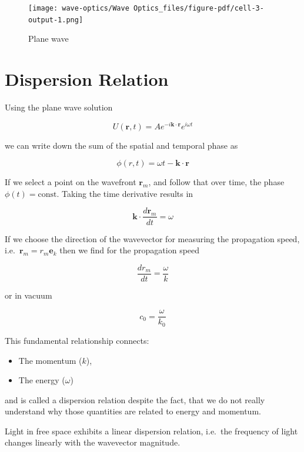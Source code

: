 \documentclass[
  a4paper,
]{book}
\providecommand{\tightlist}{%
  \setlength{\itemsep}{0pt}\setlength{\parskip}{0pt}}
\begin{document}
\begin{figure}[H]

{\centering \texttt{[image: wave-optics/Wave Optics\_files/figure-pdf/cell-3-output-1.png]}

}

\caption{Plane wave}

\end{figure}%

\section{Dispersion Relation}\label{dispersion-relation}

Using the plane wave solution

\begin{equation}
U(\mathbf{r},t)=Ae^{-i\mathbf{k}\cdot \mathbf{r}}e^{i\omega t}
\end{equation}

we can write down the sum of the spatial and temporal phase as

\[
\phi(r,t)=\omega t-\mathbf{k}\cdot \mathbf{r}
\]

If we select a point on the wavefront \(\mathbf{r}_{m}\), and follow
that over time, the phase \(\phi(t)=\text{const}\). Taking the time
derivative results in

\[
\mathbf{k}\cdot \frac{d\mathbf{r}_{m}}{dt}=\omega
\]

If we choose the direction of the wavevector for measuring the
propagation speed, i.e.~\(\mathbf{r}_{m}=r_{m}\mathbf{e}_k\) then we
find for the propagation speed

\[
\frac{dr_{m}}{dt}=\frac{\omega}{k}
\]

or in vacuum

\begin{equation}
c_0=\frac{\omega}{k_0}
\end{equation}

This fundamental relationship connects:

\begin{itemize}
\tightlist
\item
  The momentum (\(k\)),
\item
  The energy (\(\omega\))
\end{itemize}

and is called a dispersion relation despite the fact, that we do not
really understand why those quantities are related to energy and
momentum.

\begin{tcolorbox}[enhanced jigsaw, coltitle=black, title=\textcolor{quarto-callout-note-color}{\faInfo}\hspace{0.5em}{Note}, colframe=quarto-callout-note-color-frame, toprule=.15mm, opacitybacktitle=0.6, left=2mm, opacityback=0, breakable, toptitle=1mm, bottomtitle=1mm, leftrule=.75mm, arc=.35mm, titlerule=0mm, colbacktitle=quarto-callout-note-color!10!white, rightrule=.15mm, bottomrule=.15mm, colback=white]

Light in free space exhibits a linear dispersion relation, i.e.~the
frequency of light changes linearly with the wavevector magnitude.

\end{tcolorbox}
\end{document}
